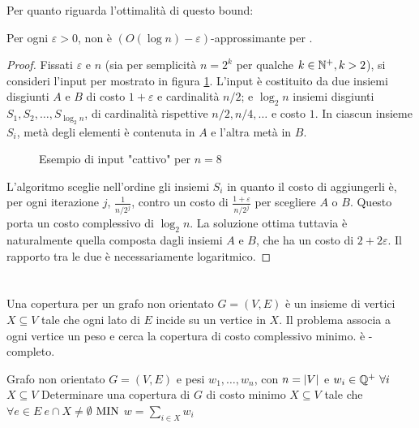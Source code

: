 Per quanto riguarda l'ottimalità di questo bound:
\begin{theorem}
	Per ogni $\varepsilon>0$, \GreedySetCover non è $(O(\log n)-\varepsilon)$-approssimante per \MinSetCover.
\end{theorem}
\begin{proof}
	Fissati $\varepsilon$ e $n$ (sia per semplicità $n=2^k$ per qualche $k\in\mathbb N^+,k>2$), si consideri l'input per \MinSetCover mostrato in figura \ref{fig:setcover_tightness}.
	L'input è costituito da due insiemi disgiunti $A$ e $B$ di costo $1+\varepsilon$ e cardinalità $n/2$; e $\log_2 n$ insiemi disgiunti $S_1,S_2,\dots,S_{\log_2 n}$, di cardinalità rispettive $n/2,n/4,\dots$ e costo $1$. In ciascun insieme $S_i$, metà degli elementi è contenuta in $A$ e l'altra metà in $B$.

	\begin{figure}[ht]
		\centering
		
		\caption{Esempio di input "cattivo" per $n=8$}
		\label{fig:setcover_tightness}
	\end{figure}

	L'algoritmo sceglie nell'ordine gli insiemi $S_i$ in quanto il costo di aggiungerli è, per ogni iterazione $j$, $\frac{1}{n/2^j}$, contro un costo di $\frac{1+\varepsilon}{n/2^j}$ per scegliere $A$ o $B$.
	Questo porta un costo complessivo di $\log_2 n$. La soluzione ottima tuttavia è naturalmente quella composta dagli insiemi $A$ e $B$, che ha un costo di $2+2\varepsilon$. Il rapporto tra le due è necessariamente logaritmico.
\end{proof}



\section{\VertexCover}
Una copertura per un grafo non orientato $G=(V,E)$ è un insieme di vertici $X\subseteq V$ tale che ogni lato di $E$ incide su un vertice in $X$.
Il problema \VertexCover associa a ogni vertice un peso e cerca la copertura di costo complessivo minimo.
\VertexCover è \NPO-completo.

\popt{\VertexCover}
{Grafo non orientato $G=(V,E)$ e pesi $w_1,\dots,w_n$, con $n=| V |$ e $w_i\in\mathbb Q^+~\forall i$}
{$X\subseteq V$}
{Determinare una copertura di $G$ di costo minimo}
{$X\subseteq V$ tale che $\forall e\in E ~ e\cap X\neq\emptyset$}
{$\mathrm{MIN}$}
{$w=\sum_{i\in X} w_i$}

